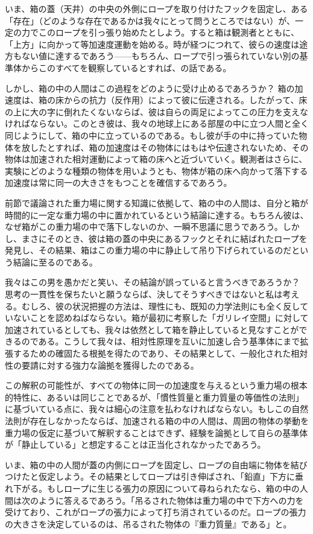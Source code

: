 \documentclass[a4paper,11pt,openany]{ltjsbook}
\begin{document}
いま、箱の蓋（天井）の中央の外側にロープを取り付けたフックを固定し、ある「存在」（どのような存在であるかは我々にとって問うところではない）が、一定の力でこのロープを引っ張り始めたとしよう。すると箱は観測者とともに、「上方」に向かって等加速度運動を始める。時が経つにつれて、彼らの速度は途方もない値に達するであろう——もちろん、ロープで引っ張られていない別の基準体からこのすべてを観察しているとすれば、の話である。

しかし、箱の中の人間はこの過程をどのように受け止めるであろうか？ 箱の加速度は、箱の床からの抗力（反作用）によって彼に伝達される。したがって、床の上に大の字に倒れたくないならば、彼は自らの両足によってこの圧力を支えなければならない。このとき彼は、我々の地球上にある部屋の中に立つ人間と全く同じようにして、箱の中に立っているのである。もし彼が手の中に持っていた物体を放したとすれば、箱の加速度はその物体にはもはや伝達されないため、その物体は加速された相対運動によって箱の床へと近づいていく。観測者はさらに、実験にどのような種類の物体を用いようとも、物体が箱の床へ向かって落下する加速度は常に同一の大きさをもつことを確信するであろう。

前節で議論された重力場に関する知識に依拠して、箱の中の人間は、自分と箱が時間的に一定な重力場の中に置かれているという結論に達する。もちろん彼は、なぜ箱がこの重力場の中で落下しないのか、一瞬不思議に思うであろう。しかし、まさにそのとき、彼は箱の蓋の中央にあるフックとそれに結ばれたロープを発見し、その結果、箱はこの重力場の中に静止して吊り下げられているのだという結論に至るのである。

我々はこの男を愚かだと笑い、その結論が誤っていると言うべきであろうか？ 思考の一貫性を保ちたいと願うならば、決してそうすべきではないと私は考える。むしろ、彼の状況把握の方法は、理性にも、既知の力学法則にも全く反していないことを認めねばならない。箱が最初に考察した「ガリレイ空間」に対して加速されているとしても、我々は依然として箱を静止していると見なすことができるのである。こうして我々は、相対性原理を互いに加速し合う基準体にまで拡張するための確固たる根拠を得たのであり、その結果として、一般化された相対性の要請に対する強力な論拠を獲得したのである。

この解釈の可能性が、すべての物体に同一の加速度を与えるという重力場の根本的特性に、あるいは同じことであるが、「慣性質量と重力質量の等価性の法則」に基づいている点に、我々は細心の注意を払わなければならない。もしこの自然法則が存在しなかったならば、加速される箱の中の人間は、周囲の物体の挙動を重力場の仮定に基づいて解釈することはできず、経験を論拠として自らの基準体が「静止している」と想定することは正当化されなかったであろう。

いま、箱の中の人間が蓋の内側にロープを固定し、ロープの自由端に物体を結びつけたと仮定しよう。その結果としてロープは引き伸ばされ、「鉛直」下方に垂れ下がる。もしロープに生じる張力の原因について尋ねられたなら、箱の中の人間は次のように答えるであろう。「吊るされた物体は重力場の中で下方への力を受けており、これがロープの張力によって打ち消されているのだ。ロープの張力の大きさを決定しているのは、吊るされた物体の『重力質量』である」と。
\end{document}
